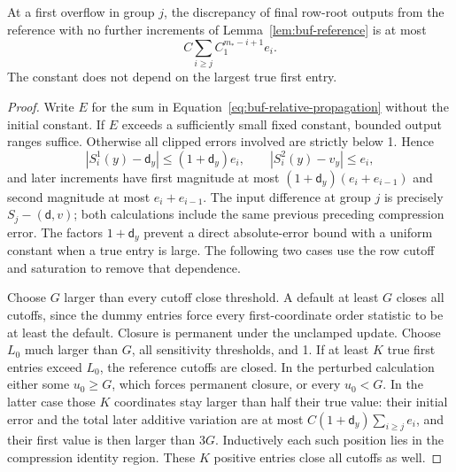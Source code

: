 \begin{lemma}
\label{lem:buf-relative-stability}
At a first overflow in group $j$, the discrepancy of final row-root outputs
from the reference with no further increments of Lemma~\ref{lem:buf-reference} is at most
\begin{equation}
 C\sum_{i\geq j} C_1^{m_*-i+1}e_i.
 \label{eq:buf-relative-propagation}
\end{equation}
The constant does not depend on the largest true first entry.
\end{lemma}
\begin{proof}
Write $E$ for the sum in Equation~\eqref{eq:buf-relative-propagation}
without the initial constant.  If $E$ exceeds a sufficiently small fixed
constant, bounded output ranges suffice.  Otherwise all clipped errors
involved are strictly below 1.  Hence
\[
 |S_i^1(y)-\mathsf{d}_y|\leq(1+\mathsf{d}_y)e_i,
 \qquad |S_i^2(y)-v_y|\leq e_i,
\]
and later increments have first magnitude at most
$(1+\mathsf{d}_y)(e_i+e_{i-1})$ and second magnitude at most $e_i+e_{i-1}$.
The input difference at group $j$ is precisely $S_j-(\mathsf{d},v)$; both
calculations include the same previous preceding compression error.
The factors $1+\mathsf{d}_y$ prevent a direct absolute-error bound with a uniform
constant when a true entry is large.  The following two cases use the
row cutoff and saturation to remove that dependence.

Choose $G$ larger than every cutoff close threshold.  A default at least
$G$ closes all cutoffs, since the dummy entries force every first-coordinate
order statistic to be at least the default.  Closure is permanent under the
unclamped update.  Choose $L_0$ much larger than $G$, all sensitivity
thresholds, and 1.  If at least $K$ true first entries exceed $L_0$, the
reference cutoffs are closed.  In the perturbed calculation either some
$u_0\geq G$, which forces permanent closure, or every $u_0<G$.
In the latter case those $K$ coordinates stay larger than half their
true value: their initial error and the total later additive variation
are at most $C(1+\mathsf{d}_y)\sum_{i\geq j}e_i$, and their first value is then
larger than $3G$.  Inductively each such position lies in the compression
identity region.  These $K$ positive entries close all cutoffs as well.


\end{proof}
